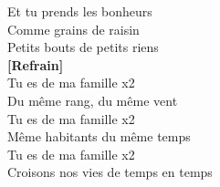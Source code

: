 \documentclass{novel}
\begin{document}
\begin{multicols}{2}
Et tu prends les bonheurs \\
Comme grains de raisin \\
Petits bouts de petits riens \\

\textbf{[Refrain]}\\

Tu es de ma famille x2 \\
Du même rang, du même vent \\
Tu es de ma famille x2 \\
Même habitants du même temps \\
Tu es de ma famille x2 \\
Croisons nos vies de temps en temps 
\end{multicols}
\end{document}
